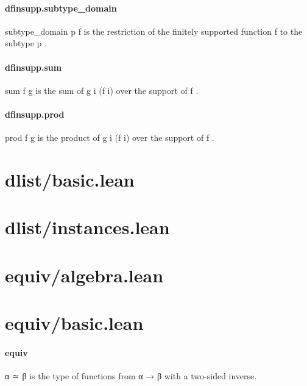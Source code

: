 \documentclass{article}
\begin{document}
\paragraph{dfinsupp.subtype\_domain}
\par
\colorbox[RGB]{253,246,227}{{{{\color[RGB]{101, 123, 131} subtype\_domain p f }}}} is the restriction of the finitely supported function
\colorbox[RGB]{253,246,227}{{{{\color[RGB]{101, 123, 131} f }}}} to the subtype 
\colorbox[RGB]{253,246,227}{{{{\color[RGB]{101, 123, 131} p }}}}.
\paragraph{dfinsupp.sum}
\par
\colorbox[RGB]{253,246,227}{{{{\color[RGB]{101, 123, 131} sum f g }}}} is the sum of 
\colorbox[RGB]{253,246,227}{{{{\color[RGB]{101, 123, 131} g i (f i) }}}} over the support of 
\colorbox[RGB]{253,246,227}{{{{\color[RGB]{101, 123, 131} f }}}}.
\paragraph{dfinsupp.prod}
\par
\colorbox[RGB]{253,246,227}{{{{\color[RGB]{101, 123, 131} prod f g }}}} is the product of 
\colorbox[RGB]{253,246,227}{{{{\color[RGB]{101, 123, 131} g i (f i) }}}} over the support of 
\colorbox[RGB]{253,246,227}{{{{\color[RGB]{101, 123, 131} f }}}}.
\section{dlist/basic.lean}\section{dlist/instances.lean}\section{equiv/algebra.lean}\section{equiv/basic.lean}\paragraph{equiv}
\par
\colorbox[RGB]{253,246,227}{{{{\color[RGB]{101, 123, 131} α ≃ β }}}} is the type of functions from 
\colorbox[RGB]{253,246,227}{{{{\color[RGB]{101, 123, 131} α  }}}{{{\color[RGB]{133, 153, 0} → }}}{{{\color[RGB]{101, 123, 131}  β }}}} with a two-sided inverse.
\end{document}
